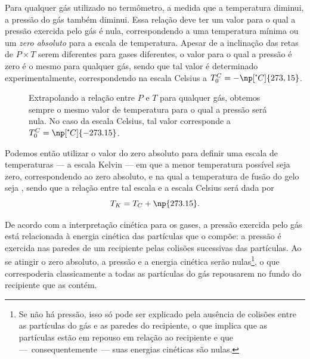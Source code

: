 Para qualquer gás utilizado no termômetro, a medida que a temperatura diminui, a pressão do gás também diminui. Essa relação deve ter um valor para o qual a pressão exercida pelo gás é nula, correspondendo a uma temperatura mínima ou um \emph{zero absoluto} para a escala de temperatura. Apesar de a inclinação das retas de $P \times T$ serem diferentes para gases diferentes, o valor para o qual a pressão é zero é o mesmo para qualquer gás, sendo que tal valor é determinado experimentalmente, correspondendo na escala Celsius a $T_0^C = -\np[\tcdegree C]{273,15}$.

\begin{figure}\forceversofloat
\centering
{}
\caption{Extrapolando a relação entre $P$ e $T$ para qualquer gás, obtemos sempre o mesmo valor de temperatura para o qual a pressão será nula. No caso da escala Celsius, tal valor corresponde a $T_0^C = \np[\tcdegree C]{-273.15}$.}
\end{figure}

Podemos então utilizar o valor do zero absoluto para definir uma escala de temperaturas --- a escala Kelvin --- em que a menor temperatura possível seja zero, correspondendo ao zero absoluto, e na qual a temperatura de fusão do gelo seja , sendo que a relação entre tal escala e a escala Celsius será dada por
\begin{equation}\label{Eq:RelKC}
	T_K = T_C + \np{273.15}.
\end{equation}

De acordo com a interpretação cinética para os gases, a pressão exercida pelo gás está relacionada à energia cinética das partículas que o compõe: a pressão é exercida nas paredes de um recipiente pelas colisões sucessivas das partículas. Ao se atingir o zero absoluto, a pressão e a energia cinética serão nulas\footnote{Se não há pressão, isso só pode ser explicado pela ausência de colisões entre as partículas do gás e as paredes do recipiente, o que implica que as partículas estão em repouso em relação ao recipiente e que ---~consequentemente~--- suas energias cinéticas são nulas.}, o que correspoderia classicamente a todas as partículas do gás repousarem no fundo do recipiente que as contém.

